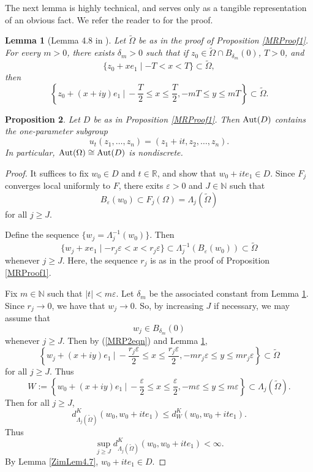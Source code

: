 \documentclass[12pt]{article}
\newcommand{\N}{\mathbb{N}}
\newcommand{\R}{\mathbb{R}}
\newcommand{\Aut}{\textup{Aut}}
\newtheorem{lemma}{Lemma}[section]
\newtheorem{proposition}[lemma]{Proposition}
\begin{document}
The next lemma is highly technical, and serves only as a tangible representation of an obvious fact.  We refer the reader to \cite{Zimmer} for the proof.

\begin{lemma}[Lemma 4.8 in \cite{Zimmer}]
\label{ZimLem4.8}
Let $\widetilde{\Omega}$ be as in the proof of Proposition \ref{MRProof1}. For every $m>0$, there exists $\delta_m>0$ such that if $z_0\in\widetilde{\Omega}\cap B_{\delta_m}(0)$, $T>0$, and 
$$\{z_0+xe_1\mid-T<x<T\}\subset\widetilde{\Omega},$$
then
$$\left\{z_0+(x+iy)e_1 \ \Bigg| \ -\frac{T}{2}\le x\le\frac{T}{2}, -mT\le y\le mT\right\}\subset\widetilde{\Omega}.$$
\end{lemma}

\begin{proposition}
\label{MRProof2}
Let $D$ be as in Proposition \ref{MRProof1}. Then $\Aut(D)$ contains the one-parameter subgroup
$$u_t(z_1,\dots,z_n)=(z_1+it,z_2,\dots,z_n).$$
In particular, $\Aut(\Omega)\cong\Aut(D)$ is nondiscrete.
\end{proposition}
\begin{proof}
It suffices to fix $w_0\in D$ and $t\in \R$, and show that $w_0+ite_1\in D$. Since $F_j$ converges local uniformly to $F$, there exits $\varepsilon>0$ and $J\in\N$ such that 
$$B_{\varepsilon}(w_0)\subset F_j(\Omega)=\Lambda_j(\widetilde{\Omega})$$
for all $j\ge J$.

Define the sequence $\{w_j=\Lambda^{-1}_j(w_0)\}$. Then 
\begin{equation}
\label{MRP2eqn}
\{w_j+xe_1\mid -r_j\varepsilon<x<r_j\varepsilon\}\subset\Lambda_j^{-1}(B_{\varepsilon}(w_0))\subset\widetilde{\Omega} 
\end{equation}
whenever $j\ge J$. Here, the sequence $r_j$ is as in the proof of Proposition \ref{MRProof1}.

Fix $m\in\N$ such that $|t|<m\varepsilon$. Let $\delta_m$ be the associated constant from Lemma \ref{ZimLem4.8}. Since $r_j\to0$, we have that $w_j\to0$. So, by increasing $J$ if necessary, we may assume that 
$$w_j\in B_{\delta_m}(0)$$
whenever $j\ge J$. Then by (\ref{MRP2eqn}) and Lemma \ref{ZimLem4.8}, 
$$\left\{w_j+(x+iy)e_1 \ \Bigg| \ -\frac{r_j\varepsilon}{2}\le x\le\frac{r_j\varepsilon}{2}, -mr_j\varepsilon\le y\le mr_j\varepsilon\right\}\subset\widetilde{\Omega}$$
for all $j\ge J$. Thus
$$W:=\left\{w_0+(x+iy)e_1 \ \Bigg| \ -\frac{\varepsilon}{2}\le x\le\frac{\varepsilon}{2}, -m\varepsilon\le y\le m\varepsilon\right\}\subset\Lambda_j(\widetilde{\Omega}).$$
Then for all $j\ge J$,
$$d^K_{\Lambda_j(\widetilde{\Omega})}(w_0,w_0+ite_1)\le d^K_{W}(w_0,w_0+ite_1).$$
Thus $$\sup_{j\ge J}d^K_{\Lambda_j(\widetilde{\Omega})}(w_0,w_0+ite_1)<\infty.$$
By Lemma \ref{ZimLem4.7}, $w_0+ite_1\in D$.
\end{proof}
\end{document}
